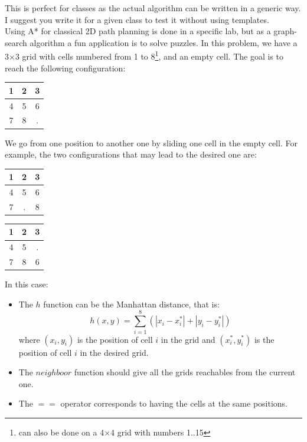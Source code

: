 \documentclass{ecnreport}
\begin{document}
This is perfect for classes as the actual algorithm can be written in a generic way. I suggest you write it for a given class to test it without using templates.\\

Using A* for classical 2D path planning is done in a specific lab, but as a graph-search algorithm a fun application is to solve puzzles.
In this problem, we have a 3$\times$3 grid with cells numbered from 1 to 8\footnote{can also be done on a 4$\times$4 grid with numbers 1..15}, and an empty cell.
The goal is to reach the following configuration:
\begin{center}
 \begin{tabular}{|c|c|c|}
 \hline  
 1 &2&3\\\hline
 4 &5&6\\\hline
 7&8&.\\\hline
 \end{tabular}
\end{center}
We go from one position to another one by sliding one cell in the empty cell. For example, the two configurations that may lead to the desired one are:
\begin{center}
 
 \begin{tabular}{|c|c|c|}
 \hline  
 1 &2&3\\\hline
 4 &5&6\\\hline
 7&.&8\\\hline
 \end{tabular}\quad\quad\quad
 \begin{tabular}{|c|c|c|}
 \hline  
 1 &2&3\\\hline
 4 &5&.\\\hline
 7&8&6\\\hline
 \end{tabular}
\end{center}

In this case:
\begin{itemize}
 \item The $h$ function can be the Manhattan distance, that is:
 \begin{equation*}
  h(x,y) = \sum_{i=1}^8(|x_i - x_i^*| + |y_i - y_i^*|)
 \end{equation*}where $(x_i,y_i)$ is the position of cell $i$ in the grid and $(x_i^*,y_i^*)$ is the position
 of cell $i$ in the desired grid.
 \item The $neighboor$ function should give all the grids reachables from the current one.
 \item The $==$ operator corresponds to having the cells at the same positions.
\end{itemize}
\end{document}
